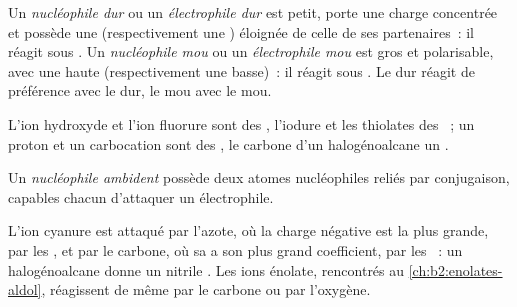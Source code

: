 \begin{definition}\label{def:b2:frontier-orbitals:hard-soft}
Un \emph{nucléophile dur} ou un \emph{électrophile dur}
est petit, porte une charge concentrée et possède
une  (respectivement une ) éloignée de celle de ses partenaires~: il réagit sous . Un \emph{nucléophile mou} ou un \emph{électrophile mou}
est gros et polarisable, avec une  haute
(respectivement une  basse)~: il réagit sous . Le dur réagit de préférence
avec le dur, le mou avec le mou.
\end{definition}

L'ion hydroxyde et l'ion fluorure sont des , l'iodure et les thiolates
des ~; un proton et un carbocation sont des , le carbone d'un
halogénoalcane un .

\begin{definition}\label{def:b2:frontier-orbitals:ambident}
Un \emph{nucléophile ambident} possède deux atomes nucléophiles
reliés par conjugaison, capables chacun d'attaquer un électrophile.
\end{definition}

L'ion cyanure est attaqué par l'azote, où la charge négative est la plus grande, par les , et par le carbone, où sa  a son plus grand coefficient, par les ~:
un halogénoalcane donne un nitrile . Les ions énolate, rencontrés au
\cref{ch:b2:enolates-aldol}, réagissent de même par le carbone ou par l'oxygène.

